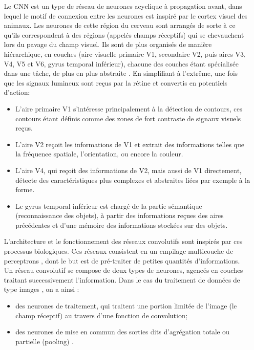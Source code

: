 	Le CNN est un type de réseau de neurones acyclique à propagation avant, dans lequel le motif de connexion entre les neurones est inspiré par le cortex visuel des animaux. Les neurones de cette région du cerveau sont arrangés de sorte à ce qu'ils correspondent à des régions (appelés champs réceptifs) qui se chevauchent lors du pavage du champ visuel. Ils sont de plus organisés de manière hiérarchique, en couches (aire visuelle primaire V1, secondaire V2, puis aires V3, V4, V5 et V6, gyrus temporal inférieur), chacune des couches étant spécialisée dans une tâche, de plus en plus abstraite \cite{antoine2018apprentissage}. En simplifiant à l'extrême, une fois que les signaux lumineux sont reçus par la rétine et convertis en potentiels d'action:
	\begin{itemize}
		\item L'aire primaire V1 s'intéresse principalement à la détection de contours, ces contours étant définis comme des zones de fort contraste de signaux visuels reçus.
		\item L'aire V2 reçoit les informations de V1 et extrait des informations telles que la fréquence spatiale, l'orientation, ou encore la couleur.
		\item L'aire V4, qui reçoit des informations de V2, mais aussi de V1 directement, détecte des caractéristiques plus complexes et abstraites liées par exemple à la forme.
		\item Le gyrus temporal inférieur est chargé de la partie sémantique (reconnaissance des objets), à partir des informations reçues des aires précédentes et d'une mémoire des informations stockées sur des objets.
	\end{itemize}
	
	L'architecture et le fonctionnement des réseaux convolutifs sont inspirés par ces processus biologiques. Ces réseaux consistent en un empilage multicouche de perceptrons \cite{tammina2019transfer}, dont le but est de pré-traiter de petites quantités d'informations.\\
	Un réseau convolutif se compose de deux types de neurones, agencés en couches traitant successivement l'information. Dans le cas du traitement de données de type images \cite{antoine2018apprentissage}, on a ainsi : 
	
	\begin{itemize}
		\item des neurones de traitement, qui traitent une portion limitée de l'image (le champ réceptif) au travers d'une fonction de convolution\cite{tammina2019transfer, antoine2018apprentissage};
		\item des neurones de mise en commun des sorties dits d'agrégation totale ou partielle (pooling) \cite{tammina2019transfer, antoine2018apprentissage}.
		
	\end{itemize}


